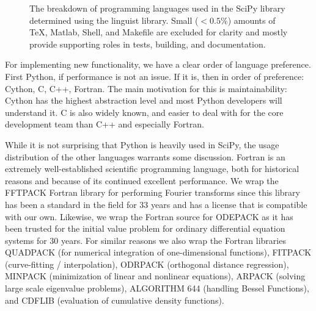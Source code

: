 \documentclass[fleqn,10pt]{wlscirep}
\begin{document}
\begin{figure}[H]
    \centering

    \caption{The breakdown of programming languages used in the
             SciPy library determined using the linguist library.
    	 Small ($<0.5 \%$) amounts of TeX, Matlab, Shell,
    	 and Makefile are excluded for clarity and mostly
    	 provide supporting roles in tests, building, and
    	 documentation.}
    \label{fig:linguist}
\end{figure}

For implementing new functionality, we have a clear order of language
preference.  First Python, if performance is not an issue. If it is, then in
order of preference: Cython, C, C++, Fortran. The main motivation for this is
maintainability: Cython has the highest abstraction level and most Python
developers will understand it. C is also widely known, and easier to deal with
for the core development team than C++ and especially Fortran.

While it is not surprising that Python is heavily used in SciPy, the usage
distribution of the other languages warrants some discussion. Fortran is an
extremely well-established scientific programming language, both for historical
reasons and because of its continued excellent
performance\cite{Koelbel:1993:HPF:562354}. We wrap the FFTPACK Fortran library
for performing Fourier transforms\cite{SWARZTRAUBER198445, SWARZTRAUBER198251}
since this library has been a standard in the field for 33 years and has a
license that is compatible with our own. Likewise, we wrap the Fortran source
for ODEPACK\cite{citeulike:2644528} as it has been  trusted for the initial
value problem for ordinary differential equation systems for 30 years. For
similar reasons we also wrap the Fortran libraries
QUADPACK\cite{1983qspa.book.....P} (for numerical integration of
one-dimensional functions), FITPACK\cite{Dierckx:1993:CSF:151103}
(curve-fitting / interpolation), ODRPACK\cite{ODRPACK_Boggs} (orthogonal
distance regression), MINPACK\cite{osti_6997568} (minimization of linear and
nonlinear equations), ARPACK\cite{leh:sor:yan96} (solving large scale
eigenvalue problems), ALGORITHM 644\cite{Amos:1986:APP:7921.214331} (handling
Bessel Functions), and CDFLIB\cite{CDFLIB_site} (evaluation of cumulative
density functions).
\end{document}
